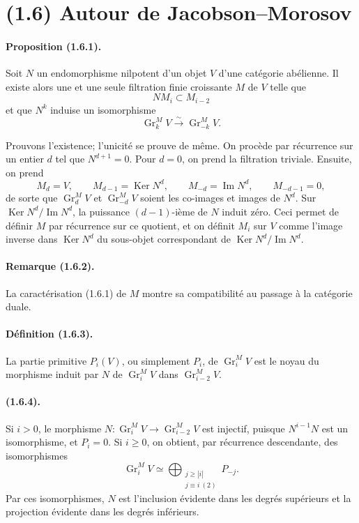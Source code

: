 \documentclass[11pt]{article}
\theoremstyle{remark}
\newcommand{\Gr}{\operatorname{Gr}}
\newcommand{\Ker}{\operatorname{Ker}}
\newcommand{\Image}{\operatorname{Im}}
\begin{document}
\section*{(1.6) Autour de Jacobson--Morosov}

\paragraph{Proposition (1.6.1).}
Soit $N$ un endomorphisme nilpotent d'un objet $V$ d'une catégorie abélienne. Il existe alors une et une seule filtration finie croissante $M$ de $V$ telle que
\[
NM_i\subset M_{i-2}
\]
et que $N^k$ induise un isomorphisme
\[
\Gr^M_kV\xrightarrow{\sim}\Gr^M_{-k}V.
\]

Prouvons l'existence; l'unicité se prouve de même. On procède par récurrence sur un entier $d$ tel que $N^{d+1}=0$. Pour $d=0$, on prend la filtration triviale. Ensuite, on prend
\[
M_d=V,
\qquad
M_{d-1}=\Ker N^d,
\qquad
M_{-d}=\Image N^d,
\qquad
M_{-d-1}=0,
\]
de sorte que $\Gr^M_dV$ et $\Gr^M_{-d}V$ soient les co-images et images de $N^d$. Sur $\Ker N^d/\Image N^d$, la puissance $(d-1)$-ième de $N$ induit zéro. Ceci permet de définir $M$ par récurrence sur ce quotient, et on définit $M_i$ sur $V$ comme l'image inverse dans $\Ker N^d$ du sous-objet correspondant de $\Ker N^d/\Image N^d$.

\paragraph{Remarque (1.6.2).}
La caractérisation (1.6.1) de $M$ montre sa compatibilité au passage à la catégorie duale.

\paragraph{Définition (1.6.3).}
La partie primitive $P_i(V)$, ou simplement $P_i$, de $\Gr^M_iV$ est le noyau du morphisme induit par $N$ de $\Gr^M_iV$ dans $\Gr^M_{i-2}V$.

\paragraph{(1.6.4).}
Si $i>0$, le morphisme $N:\Gr^M_iV\to\Gr^M_{i-2}V$ est injectif, puisque $N^{i-1}N$ est un isomorphisme, et $P_i=0$. Si $i\ge0$, on obtient, par récurrence descendante, des isomorphismes
\begin{equation}\tag{1.6.4.1}
\Gr^M_iV\simeq\bigoplus_{\substack{j\ge |i|\\ j\equiv i\ (2)}}P_{-j}.
\end{equation}
Par ces isomorphismes, $N$ est l'inclusion évidente dans les degrés supérieurs et la projection évidente dans les degrés inférieurs.
\end{document}
